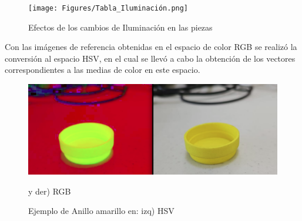 \begin{figure}[H]
\centering
\texttt{[image: Figures/Tabla\_Iluminación.png]}
    \caption{Efectos de los cambios de Iluminación en las piezas}
    \label{fig:Ilumination}
\end{figure}

Con las imágenes de referencia obtenidas en el espacio de color RGB se realizó la conversión al espacio HSV, en el cual se llevó a cabo la obtención de los vectores correspondientes a las medias de color en este espacio.

\begin{figure}[H]
\centering
\includegraphics[scale= 0.3]{Figures/HSV_YellowRing.png}
    \caption{Ejemplo de Anillo amarillo en: izq) HSV} y der) RGB
    \label{fig:YellowRing_HSV}
\end{figure}

